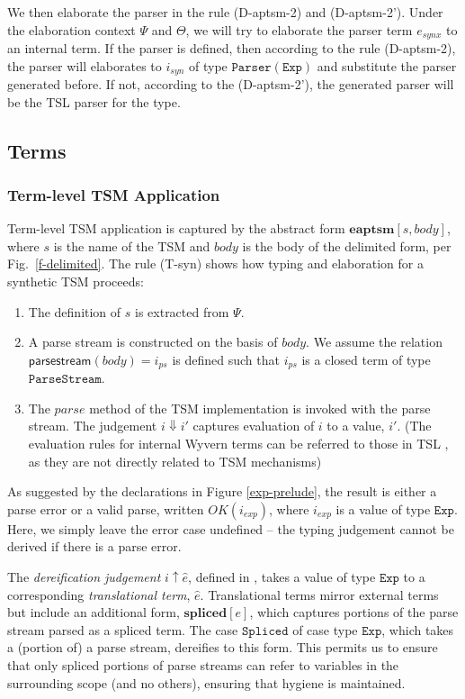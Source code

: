 We then elaborate the parser in the rule (D-aptsm-2) and (D-aptsm-2'). Under the elaboration context $\Psi$ and $\Theta$, we will try to elaborate the parser term $e_{synx}$ to an internal term. If the parser is defined, then according to the rule (D-aptsm-2), the parser will elaborates to $i_{syn}$ of type $\mathtt{Parser(Exp)}$ and substitute the parser generated before. If not, according to the (D-aptsm-2'), the generated parser will be the TSL parser for the type.




\subsection{Terms}
\subsubsection{Term-level TSM Application}
Term-level TSM application is captured by the abstract form $\textbf{eaptsm}[s, body]$, where $s$ is the name of the TSM and $body$ is the body of the delimited form, per Fig.~\ref{f-delimited}. The rule (T-syn) shows how typing and elaboration for a synthetic TSM proceeds:
\begin{enumerate}\itemsep0pt
\item The definition of $s$ is extracted from $\Psi$. 
\item A parse stream is constructed on the basis of $body$. We assume the relation $\mathsf{parsestream}(body)=i_{ps}$ is defined such that $i_{ps}$ is a closed term of type $\mathtt{ParseStream}$. 
\item The $parse$ method of the TSM implementation is invoked with the parse stream. The judgement $i \Downarrow i'$ captures evaluation of $i$ to a value, $i'$. (The evaluation rules for internal Wyvern terms can be referred to those in TSL \cite{TSLs}, as they are not directly related to TSM mechanisms)
\end{enumerate}
As suggested by the declarations in Figure \ref{exp-prelude}, the result is either a parse error or a valid parse, written $OK(i_{exp})$, where $i_{exp}$ is a value of type $\mathtt{Exp}$. Here, we simply leave the error case undefined -- the typing judgement cannot be derived if there is a parse error.%

The \emph{dereification judgement} $i \uparrow \hat{e}$, defined in \cite{TSLs}, takes a value of type $\mathtt{Exp}$ to a corresponding \emph{translational term}, $\hat{e}$. 
Translational terms mirror external terms but include an additional form, $\textbf{spliced}[e]$, which captures portions of the parse stream parsed as a spliced term. The case $\mathtt{Spliced}$ of case type $\mathtt{Exp}$, which takes a (portion of) a parse stream, dereifies to this form. This permits us to ensure that only spliced portions of parse streams can refer to variables in the surrounding scope (and no others), ensuring that hygiene is maintained. 

